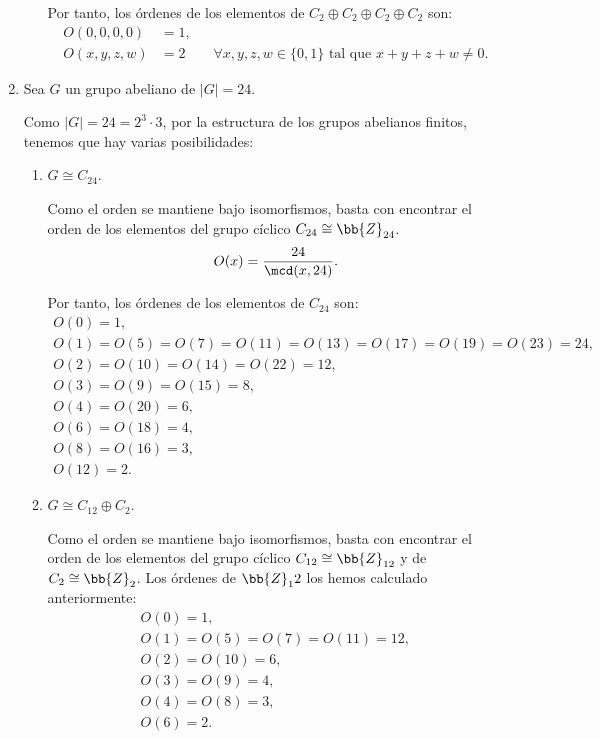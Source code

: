\begin{ejercicio}
\begin{enumerate}
\begin{enumerate}
            Por tanto, los órdenes de los elementos de $C_2 \oplus C_2 \oplus C_2 \oplus C_2$ son:
            \begin{align*}
                O(0, 0, 0, 0) &= 1, \\
                O(x, y, z, w) &= 2 \qquad \forall x,y,z,w \in \{0,1\} \text{ tal que } x+y+z+w \neq 0.
            \end{align*}
        \end{enumerate}

        \item Sea $G$ un grupo abeliano de $|G| = 24$.
        
        Como $|G|=24=2^3 \cdot 3$, por la estructura de los grupos abelianos finitos, tenemos que hay varias posibilidades:
        \begin{enumerate}
            \item $G \cong C_{24}$.
            
            Como el orden se mantiene bajo isomorfismos, basta con encontrar el orden de los elementos del grupo cíclico $C_{24}\cong \bb{Z}_{24}$.
            \begin{equation*}
                O(x) = \frac{24}{\mcd(x, 24)}.
            \end{equation*}

            Por tanto, los órdenes de los elementos de $C_{24}$ son:
            \begin{gather*}
                O(0) = 1, \\
                O(1) = O(5) = O(7) = O(11) = O(13) = O(17) = O(19) = O(23) = 24, \\
                O(2) = O(10) = O(14) = O(22) = 12, \\
                O(3) = O(9) = O(15) = 8, \\
                O(4) = O(20) = 6, \\
                O(6) = O(18) = 4, \\
                O(8) = O(16) = 3, \\
                O(12) = 2.
            \end{gather*}
            
            \item $G \cong C_{12} \oplus C_2$.
            
            Como el orden se mantiene bajo isomorfismos, basta con encontrar el orden de los elementos del grupo cíclico $C_{12}\cong \bb{Z}_{12}$ y de $C_2\cong \bb{Z}_2$.
            Los órdenes de $\bb{Z}_12$ los hemos calculado anteriormente:
            \begin{gather*}
                O(0) = 1, \\
                O(1) = O(5) = O(7) = O(11) = 12, \\
                O(2) = O(10) = 6, \\
                O(3) = O(9) = 4, \\
                O(4) = O(8) = 3, \\
                O(6) = 2.
            \end{gather*}


\end{enumerate}
\end{enumerate}
\end{ejercicio}
